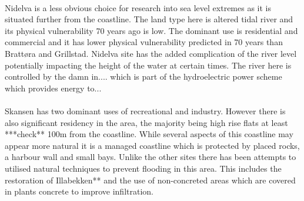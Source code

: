 \paragraph{}
Nidelva is a less obvious choice for research into sea level extremes as it is situated further from the coastline. The land type here is altered tidal river and its physical vulnerability 70 years ago is low. The dominant use is residential and commercial and it has lower physical vulnerability predicted in 70 years than Brattøra and Grillstad. Nidelva site has the added complication of the river level potentially impacting the height of the water at certain times. The river here is controlled by the damn in.... which is part of the hydroelectric power scheme which provides energy to...
\paragraph{}
Skansen has two dominant uses of recreational and industry. However there is also significant residency in the area, the majority being high rise flats at least ***check** 100m from the coastline. While several aspects of this coastline may appear more natural it is a managed coastline which is protected by placed rocks, a harbour wall and small bays. Unlike the other sites there has been attempts to utilised natural techniques to prevent flooding in this area. This includes the restoration of Illabekken** and the use of non-concreted areas which are covered in plants concrete to improve infiltration.
\paragraph{}


